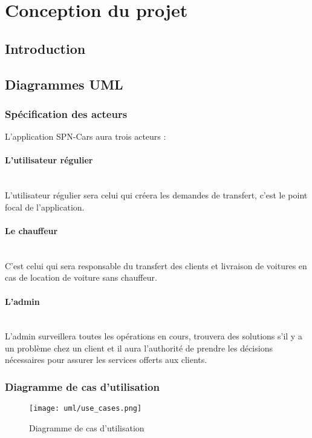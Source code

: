 \section{Conception du projet}
\subsection{Introduction}
\subsection{Diagrammes UML}
\subsubsection{Spécification des acteurs}
L'application SPN-Cars aura trois acteurs :
\paragraph{L'utilisateur régulier}\mbox{} \\
L'utilisateur régulier sera celui qui créera les demandes de transfert, c'est le point focal de l'application.
\paragraph{Le chauffeur}\mbox{} \\
C'est celui qui sera responsable du transfert des clients et livraison de voitures en cas de location de voiture sans chauffeur.
\paragraph{L'admin}\mbox{} \\
L'admin surveillera toutes les opérations en cours, trouvera des solutions s'il y a un problème chez un client et il aura l'authorité de prendre les décisions nécessaires pour assurer les services offerts aux clients.
\subsubsection{Diagramme de cas d'utilisation}
\begin{figure}[H]
    \centering
    \texttt{[image: uml/use\_cases.png]}
    \vspace{1cm}
    \caption{Diagramme de cas d'utilisation}
    \label{fig:use_case_diag}
\end{figure}


